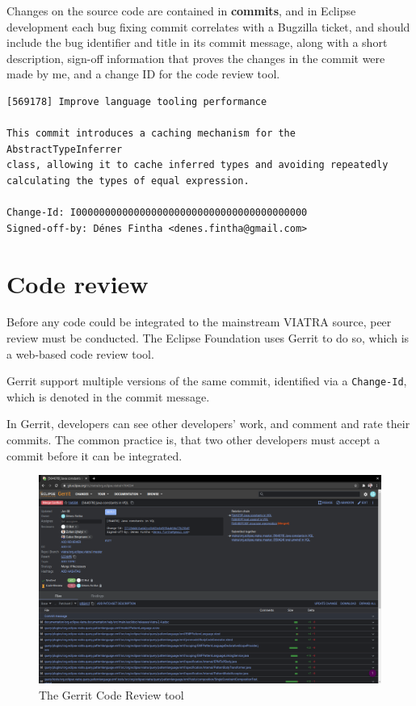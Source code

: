 \documentclass[11pt,a4paper,oneside]{report}
\begin{document}
Changes on the source code are contained in \textbf{commits}, and in Eclipse
development each bug fixing commit correlates with a Bugzilla ticket, and
should include the bug identifier and title in its commit message, along with
a short description, sign-off information that proves the changes in the commit
were made by me, and a change ID for the code review tool.

\begin{lstlisting}
[569178] Improve language tooling performance

This commit introduces a caching mechanism for the AbstractTypeInferrer
class, allowing it to cache inferred types and avoiding repeatedly
calculating the types of equal expression.

Change-Id: I0000000000000000000000000000000000000000
Signed-off-by: Dénes Fintha <denes.fintha@gmail.com>
\end{lstlisting}

\section{Code review}
Before any code could be integrated to the mainstream VIATRA source, peer review
must be conducted. The Eclipse Foundation uses Gerrit to do so, which is a
web-based code review tool.

Gerrit support multiple versions of the same commit, identified via a
\texttt{Change-Id}, which is denoted in the commit message.

In Gerrit, developers can see other developers' work, and comment and rate their
commits. The common practice is, that two other developers must accept a
commit before it can be integrated.

\begin{figure}[ht]
\centering
\includegraphics[width=150mm, keepaspectratio]{figures/gerrit.png}
\caption{The Gerrit Code Review tool}
\label{fig:gerrit}
\end{figure}
\end{document}
